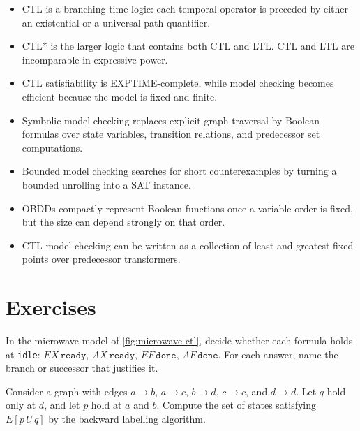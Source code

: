 \begin{summarybox}
\begin{itemize}[nosep]
  \item CTL is a branching-time logic: each temporal operator is preceded by
        either an existential or a universal path quantifier.
  \item CTL* is the larger logic that contains both CTL and LTL.  CTL and
        LTL are incomparable in expressive power.
  \item CTL satisfiability is EXPTIME-complete, while model checking becomes
        efficient because the model is fixed and finite.
  \item Symbolic model checking replaces explicit graph traversal by Boolean
        formulas over state variables, transition relations, and predecessor
        set computations.
  \item Bounded model checking searches for short counterexamples by turning
        a bounded unrolling into a SAT instance.
  \item OBDDs compactly represent Boolean functions once a variable order is
        fixed, but the size can depend strongly on that order.
  \item CTL model checking can be written as a collection of least and
        greatest fixed points over predecessor transformers.
\end{itemize}
\end{summarybox}

\section*{Exercises}

\begin{chapex}
In the microwave model of \cref{fig:microwave-ctl}, decide
whether each formula holds at \texttt{idle}:
$EX\,\texttt{ready}$, $AX\,\texttt{ready}$, $EF\,\texttt{done}$,
$AF\,\texttt{done}$.
For each answer, name the branch or successor that justifies it.
\end{chapex}

\begin{chapex}[Labelling $E(p\,U\,q)$]
Consider a graph with edges $a\to b$, $a\to c$, $b\to d$,
$c\to c$, and $d\to d$.  Let $q$ hold only at $d$, and let $p$ hold
at $a$ and $b$.  Compute the set of states satisfying $E[p\,U\,q]$
by the backward labelling algorithm.
\end{chapex}

